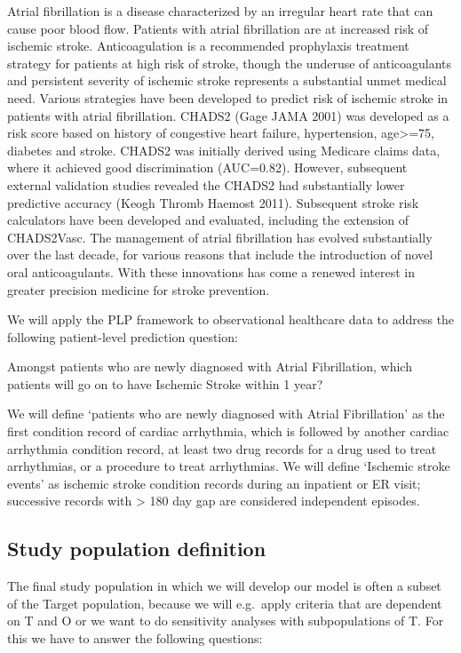 \documentclass[]{book}
\begin{document}
Atrial fibrillation is a disease characterized by an irregular heart
rate that can cause poor blood flow. Patients with atrial fibrillation
are at increased risk of ischemic stroke. Anticoagulation is a
recommended prophylaxis treatment strategy for patients at high risk of
stroke, though the underuse of anticoagulants and persistent severity of
ischemic stroke represents a substantial unmet medical need. Various
strategies have been developed to predict risk of ischemic stroke in
patients with atrial fibrillation. CHADS2 (Gage JAMA 2001) was developed
as a risk score based on history of congestive heart failure,
hypertension, age\textgreater{}=75, diabetes and stroke. CHADS2 was
initially derived using Medicare claims data, where it achieved good
discrimination (AUC=0.82). However, subsequent external validation
studies revealed the CHADS2 had substantially lower predictive accuracy
(Keogh Thromb Haemost 2011). Subsequent stroke risk calculators have
been developed and evaluated, including the extension of CHADS2Vasc. The
management of atrial fibrillation has evolved substantially over the
last decade, for various reasons that include the introduction of novel
oral anticoagulants. With these innovations has come a renewed interest
in greater precision medicine for stroke prevention.

We will apply the PLP framework to observational healthcare data to
address the following patient-level prediction question:

Amongst patients who are newly diagnosed with Atrial Fibrillation, which
patients will go on to have Ischemic Stroke within 1 year?

We will define `patients who are newly diagnosed with Atrial
Fibrillation' as the first condition record of cardiac arrhythmia, which
is followed by another cardiac arrhythmia condition record, at least two
drug records for a drug used to treat arrhythmias, or a procedure to
treat arrhythmias. We will define `Ischemic stroke events' as ischemic
stroke condition records during an inpatient or ER visit; successive
records with \textgreater{} 180 day gap are considered independent
episodes.

\subsection{Study population
definition}\label{study-population-definition}

The final study population in which we will develop our model is often a
subset of the Target population, because we will e.g.~apply criteria
that are dependent on T and O or we want to do sensitivity analyses with
subpopulations of T. For this we have to answer the following questions:
\end{document}
